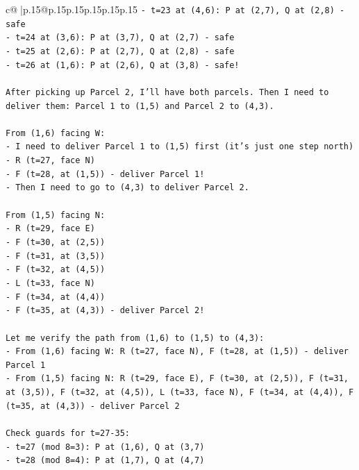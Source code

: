\documentclass{article}
\begin{document}
{\begin{supertabular}{c@{$\;$}|p{.15\linewidth}@{}p{.15\linewidth}p{.15\linewidth}p{.15\linewidth}p{.15\linewidth}p{.15\linewidth}}
{{{\texttt{{-} t=23 at (4,6): P at (2,7), Q at (2,8) {-} safe} \\
\texttt{{-} t=24 at (3,6): P at (3,7), Q at (2,7) {-} safe} \\
\texttt{{-} t=25 at (2,6): P at (2,7), Q at (2,8) {-} safe} \\
\texttt{{-} t=26 at (1,6): P at (2,6), Q at (3,8) {-} safe!} \\
\\ 
\texttt{After picking up Parcel 2, I'll have both parcels. Then I need to deliver them: Parcel 1 to (1,5) and Parcel 2 to (4,3).} \\
\\ 
\texttt{From (1,6) facing W:} \\
\texttt{{-} I need to deliver Parcel 1 to (1,5) first (it's just one step north)} \\
\texttt{{-} R (t=27, face N)} \\
\texttt{{-} F (t=28, at (1,5)) {-} deliver Parcel 1!} \\
\texttt{{-} Then I need to go to (4,3) to deliver Parcel 2.} \\
\\ 
\texttt{From (1,5) facing N:} \\
\texttt{{-} R (t=29, face E)} \\
\texttt{{-} F (t=30, at (2,5))} \\
\texttt{{-} F (t=31, at (3,5))} \\
\texttt{{-} F (t=32, at (4,5))} \\
\texttt{{-} L (t=33, face N)} \\
\texttt{{-} F (t=34, at (4,4))} \\
\texttt{{-} F (t=35, at (4,3)) {-} deliver Parcel 2!} \\
\\ 
\texttt{Let me verify the path from (1,6) to (1,5) to (4,3):} \\
\texttt{{-} From (1,6) facing W: R (t=27, face N), F (t=28, at (1,5)) {-} deliver Parcel 1} \\
\texttt{{-} From (1,5) facing N: R (t=29, face E), F (t=30, at (2,5)), F (t=31, at (3,5)), F (t=32, at (4,5)), L (t=33, face N), F (t=34, at (4,4)), F (t=35, at (4,3)) {-} deliver Parcel 2} \\
\\ 
\texttt{Check guards for t=27{-}35:} \\
\texttt{{-} t=27 (mod 8=3): P at (1,6), Q at (3,7)} \\
\texttt{{-} t=28 (mod 8=4): P at (1,7), Q at (4,7)} \\
}}}
\end{supertabular}}
\end{document}
